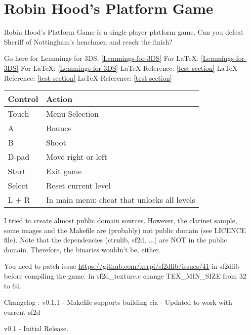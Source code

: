 

\chapter{Robin Hood's Platform Game}\label{Robin-Hood's-Platform-Game}

Robin Hood's Platform Game is a single player platform game.
Can you defeat Sheriff of Nottingham's henchmen and reach the finish?

Go here for Lemmings for 3DS: \ref{Lemmings-for-3DS}
For LaTeX: \ref{Lemmings-for-3DS}
For LaTeX: \ref{Lemmings-for-3DS}
LaTeX-Reference: \ref{test-section}
LaTeX-Reference: \ref{test-section}
LaTeX-Reference: \ref{test-section}



\vspace{9pt}
\begin{tabular}{ll}
	 Control  &  Action               \tabularnewline\hline
	 Touch    &  Menu Selection       \tabularnewline
	 A        &  Bounce               \tabularnewline
	 B        &  Shoot                \tabularnewline
	 D-pad    &  Move right or left   \tabularnewline
	 Start    &  Exit game            \tabularnewline
	 Select   &  Reset current level  \tabularnewline
	 L + R    &  In main menu: cheat that unlocks all levels 
\end{tabular}
\vspace{9pt}

I tried to create almost public domain sources.
However, the clarinet sample, some images and the Makefile are (probably) not public domain (see LICENCE file).
Note that the dependencies (ctrulib, sf2d, ...) are NOT in the public domain. Therefore, the binaries wouldn't be, either.

You need to patch issue \url{https://github.com/xerpi/sf2dlib/issues/41} in sf2dlib before compiling the game. In sf2d\_texture.c change TEX\_MIN\_SIZE from 32 to 64.


Changelog :
v0.1.1
	- Makefile supports building cia
	- Updated to work with current sf2d

v0.1
	- Initial Release.
